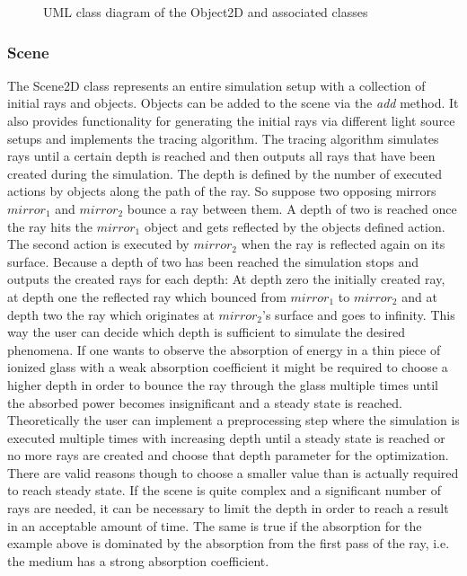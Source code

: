 \documentclass[a4paper,10pt]{article}
\begin{document}
\begin{center}
\begin{figure}
    \caption{UML class diagram of the Object2D and associated classes}
    \label{fig:uml_object2d}
    \end{figure}
    \end{center}

    \subsubsection{Scene}

    The Scene2D class represents an entire simulation setup with
    a collection of initial rays and objects.
    Objects can be added to the scene via the \emph{add} method.
    It also provides functionality for generating the initial rays
    via different light source setups and implements the tracing algorithm.
    The tracing algorithm simulates rays until a certain depth is reached
    and then outputs all rays that have been created during the simulation.
    The depth is defined by the number of executed actions by objects 
    along the path of the ray.
    So suppose two opposing mirrors $mirror_1$ and $mirror_2$ bounce a
    ray between them.
    A depth of two is reached once the ray hits the $mirror_1$ object
    and gets reflected by the objects defined action.
    The second action is executed by $mirror_2$ when the ray is reflected
    again on its surface.
    Because a depth of two has been reached the simulation stops and
    outputs the created rays for each depth:
    At depth zero the initially created ray, at depth one the reflected
    ray which bounced from $mirror_1$ to $mirror_2$ and at depth two
    the ray which originates at $mirror_2$'s surface and goes to infinity.
    This way the user can decide which depth is sufficient to simulate
    the desired phenomena.
    If one wants to observe the absorption of energy in a thin piece of
    ionized glass with a weak absorption coefficient it might be required
    to choose a higher depth in order to bounce the ray through the 
    glass multiple times until the absorbed power becomes insignificant
    and a steady state is reached.
    Theoretically the user can implement a preprocessing step where the
    simulation is executed multiple times with increasing depth until
    a steady state is reached or no more rays are created and choose
    that depth parameter for the optimization.
    There are valid reasons though to choose a smaller value than is
    actually required to reach steady state.
    If the scene is quite complex and a significant number of rays are
    needed, it can be necessary to limit the depth in order to reach
    a result in an acceptable amount of time.
    The same is true if the absorption for the example above is
    dominated by the absorption from the first pass of the ray, 
    i.e. the medium has a strong absorption coefficient.
\end{document}
